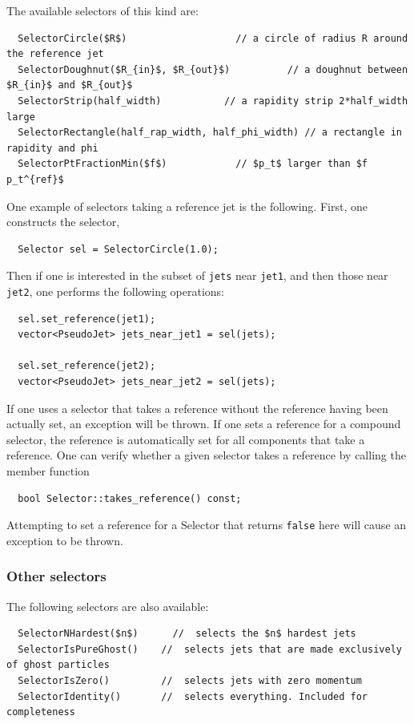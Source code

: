 \documentclass[12pt,a4]{article}
\newcommand{\ttt}[1]{{\small\texttt{#1}}}
\begin{document}
The available selectors of this kind are:
\begin{lstlisting}
  SelectorCircle($R$)                   // a circle of radius R around the reference jet
  SelectorDoughnut($R_{in}$, $R_{out}$)          // a doughnut between $R_{in}$ and $R_{out}$
  SelectorStrip(half_width)           // a rapidity strip 2*half_width large 
  SelectorRectangle(half_rap_width, half_phi_width) // a rectangle in rapidity and phi
  SelectorPtFractionMin($f$)            // $p_t$ larger than $f p_t^{ref}$
\end{lstlisting}
%
One example of selectors taking a reference jet is the following. 
First, one constructs the selector, 
\begin{lstlisting}
  Selector sel = SelectorCircle(1.0);
\end{lstlisting}
Then if one is interested in the subset of \ttt{jets} near
\ttt{jet1}, and then those near \ttt{jet2}, one performs the following
operations:
\begin{lstlisting}
  sel.set_reference(jet1);
  vector<PseudoJet> jets_near_jet1 = sel(jets);

  sel.set_reference(jet2);
  vector<PseudoJet> jets_near_jet2 = sel(jets);
\end{lstlisting}
If one uses a selector that takes a reference without the reference having been
actually set, an exception will be thrown.
%
If one sets a reference for a compound selector, the reference is
automatically set for all components that take a reference.
%
One can verify whether a given selector takes a reference by calling
the member function
\begin{lstlisting}
  bool Selector::takes_reference() const;
\end{lstlisting}
Attempting to set a reference for a Selector that returns \ttt{false}
here will cause an exception to be thrown.
%

\subsubsection{Other selectors}

The following selectors are also available:

\begin{lstlisting}
  SelectorNHardest($n$)      //  selects the $n$ hardest jets
  SelectorIsPureGhost()    //  selects jets that are made exclusively of ghost particles
  SelectorIsZero()         //  selects jets with zero momentum
  SelectorIdentity()       //  selects everything. Included for completeness
\end{lstlisting}
\end{document}
